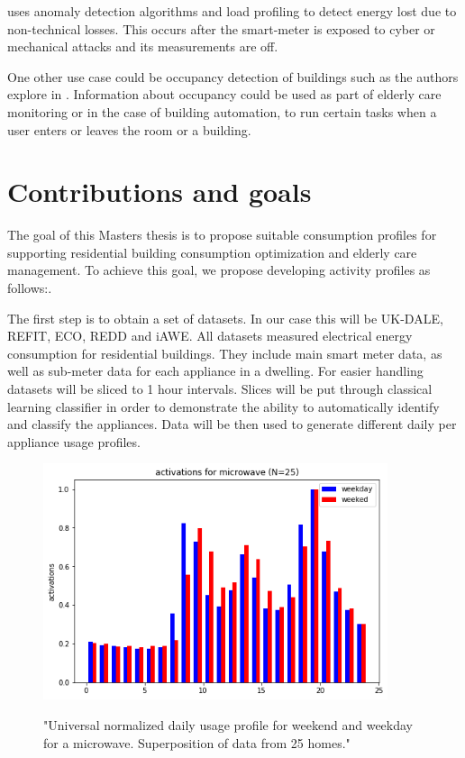 \documentclass[
11pt, %
english, %
singlespacing, %
headsepline, %
]{MastersDoctoralThesis} %
\begin{document}
\cite{energyStealing2018} uses anomaly detection algorithms and load profiling to detect energy lost due to non-technical losses.
This occurs after the smart-meter is exposed to cyber or mechanical attacks and its measurements are off. 

One other use case could be occupancy detection of buildings such as the authors explore in \cite{occupancy2013}. Information about 
occupancy could be used as part of elderly care monitoring or in the case of building
automation, to run certain tasks when a user enters or leaves the room or a building.

\chapter{Contributions and goals}

The goal of this Masters thesis is to propose suitable consumption profiles for supporting residential building consumption optimization and elderly care management.
To achieve this goal, we propose developing activity profiles as follows:. 

The first step is to obtain a set of datasets. In our case this will be UK-DALE, REFIT, ECO, REDD and iAWE.
All datasets measured electrical energy consumption for residential buildings. 
They include main smart meter data, as well as sub-meter data for each appliance in a dwelling. 
For easier handling datasets will be sliced to 1 hour intervals. 
Slices will be put through classical learning classifier in order to demonstrate the ability to automatically identify and classify the appliances.
Data will be then used to generate different daily per appliance usage profiles.

\begin{figure}[h!]
	\centering
	\caption{"Universal normalized daily usage profile for weekend and weekday for a microwave. Superposition of data from 25 homes."}
	\includegraphics[width=0.9\textwidth]{Figures/microwave_norm_n25.png}
	\label{fig:UniNormMicrowave}
\end{figure}
\end{document}
